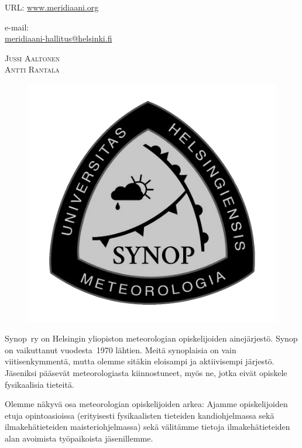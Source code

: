 \documentclass[a5paper, 8pt, twocolumn]{book} %
\numberwithin{equation}{section}
\begin{document}
\noindent URL: \url{www.meridiaani.org}

\noindent e-mail: \\\url{meridiaani-hallitus@helsinki.fi}

\vspace{0.5cm}\noindent\textsc{Jussi Aaltonen}\\\textsc{Antti Rantala}

\begin{figure}[!b]
	\centering
	\includegraphics[width=\columnwidth]{synoplogo.png}
\end{figure}
Synop~ry on Helsingin yliopiston meteorologian opiskelijoiden ainejärjestö. Synop on vaikuttanut vuodesta~1970 lähtien. Meitä synoplaisia on vain viitisenkymmentä, mutta olemme sitäkin eloisampi ja aktiivisempi järjestö. Jäseniksi pääsevät meteorologiasta kiinnostuneet, myös ne, jotka eivät opiskele fysikaalisia tieteitä.

Olemme näkyvä osa meteorologian
opiskelijoiden arkea: Ajamme opiskelijoiden
etuja opintoasioissa (erityisesti fysikaalisten tieteiden kandiohjelmassa sekä
ilmakehätieteiden maisteriohjelmassa) sekä välitämme tietoja ilmakehätieteiden alan
avoimista työpaikoista jäsenillemme.
\end{document}
